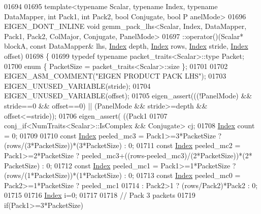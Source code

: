 \begin{DoxyCode}
01694 
01695 \textcolor{keyword}{template}<\textcolor{keyword}{typename} Scalar, \textcolor{keyword}{typename} Index, \textcolor{keyword}{typename} DataMapper, \textcolor{keywordtype}{int} Pack1, \textcolor{keywordtype}{int} Pack2, \textcolor{keywordtype}{bool} Conjugate, \textcolor{keywordtype}{bool} P
      anelMode>
01696 EIGEN\_DONT\_INLINE \textcolor{keywordtype}{void} gemm\_pack\_lhs<Scalar, Index, DataMapper, Pack1, Pack2, ColMajor, Conjugate,
       PanelMode>
01697   ::operator()(Scalar* blockA, \textcolor{keyword}{const} DataMapper& lhs, \hyperlink{namespace_eigen_a62e77e0933482dafde8fe197d9a2cfde}{Index} depth, \hyperlink{namespace_eigen_a62e77e0933482dafde8fe197d9a2cfde}{Index} rows, 
      \hyperlink{namespace_eigen_a62e77e0933482dafde8fe197d9a2cfde}{Index} stride, \hyperlink{namespace_eigen_a62e77e0933482dafde8fe197d9a2cfde}{Index} offset)
01698 \{
01699   \textcolor{keyword}{typedef} \textcolor{keyword}{typename} packet\_traits<Scalar>::type Packet;
01700   \textcolor{keyword}{enum} \{ PacketSize = packet\_traits<Scalar>::size \};
01701 
01702   EIGEN\_ASM\_COMMENT(\textcolor{stringliteral}{"EIGEN PRODUCT PACK LHS"});
01703   EIGEN\_UNUSED\_VARIABLE(stride);
01704   EIGEN\_UNUSED\_VARIABLE(offset);
01705   eigen\_assert(((!PanelMode) && stride==0 && offset==0) || (PanelMode && stride>=depth && offset<=stride));
01706   eigen\_assert( ((Pack1%
01707   conj\_if<NumTraits<Scalar>::IsComplex && Conjugate> cj;
01708   \hyperlink{namespace_eigen_a62e77e0933482dafde8fe197d9a2cfde}{Index} count = 0;
01709 
01710   \textcolor{keyword}{const} \hyperlink{namespace_eigen_a62e77e0933482dafde8fe197d9a2cfde}{Index} peeled\_mc3 = Pack1>=3*PacketSize ? (rows/(3*PacketSize))*(3*PacketSize) : 0;
01711   \textcolor{keyword}{const} \hyperlink{namespace_eigen_a62e77e0933482dafde8fe197d9a2cfde}{Index} peeled\_mc2 = Pack1>=2*PacketSize ? peeled\_mc3+((rows-peeled\_mc3)/(2*PacketSize))*(2*
      PacketSize) : 0;
01712   \textcolor{keyword}{const} \hyperlink{namespace_eigen_a62e77e0933482dafde8fe197d9a2cfde}{Index} peeled\_mc1 = Pack1>=1*PacketSize ? (rows/(1*PacketSize))*(1*PacketSize) : 0;
01713   \textcolor{keyword}{const} \hyperlink{namespace_eigen_a62e77e0933482dafde8fe197d9a2cfde}{Index} peeled\_mc0 = Pack2>=1*PacketSize ? peeled\_mc1
01714                          : Pack2>1             ? (rows/Pack2)*Pack2 : 0;
01715 
01716   \hyperlink{namespace_eigen_a62e77e0933482dafde8fe197d9a2cfde}{Index} i=0;
01717 
01718   \textcolor{comment}{// Pack 3 packets}
01719   \textcolor{keywordflow}{if}(Pack1>=3*PacketSize)

\end{DoxyCode}

